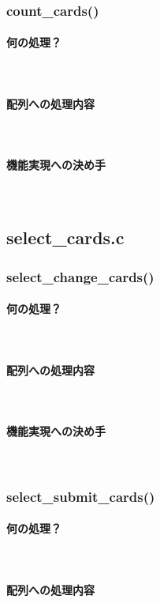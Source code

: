 \documentclass[11pt,a4paper, uplatex]{jsarticle}
\begin{document}
\subsubsection{count\_cards()}
\paragraph{何の処理？}\mbox{}\\
\paragraph{配列への処理内容}\mbox{}\\
\paragraph{機能実現への決め手}\mbox{}\\
%
\subsection{select\_cards.c}
%
\subsubsection{select\_change\_cards()}
\paragraph{何の処理？}\mbox{}\\
\paragraph{配列への処理内容}\mbox{}\\
\paragraph{機能実現への決め手}\mbox{}\\
%
\subsubsection{select\_submit\_cards()}
\paragraph{何の処理？}\mbox{}\\
\paragraph{配列への処理内容}\mbox{}\\
\end{document}
